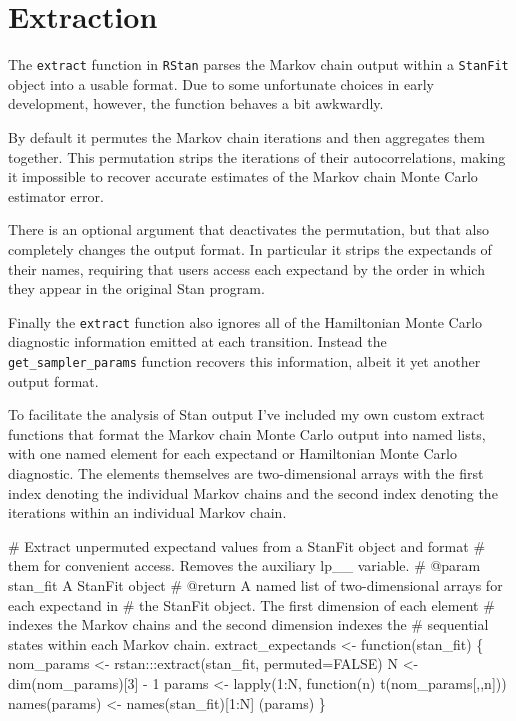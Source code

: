 \documentclass[
  letterpaper,
  DIV=11,
  numbers=noendperiod]{scrartcl}
\newenvironment{Shaded}{\begin{snugshade}}{\end{snugshade}}
\newcommand{\CommentTok}[1]{\textcolor[rgb]{0.37,0.37,0.37}{#1}}
\newcommand{\DecValTok}[1]{\textcolor[rgb]{0.68,0.00,0.00}{#1}}
\newcommand{\NormalTok}[1]{\textcolor[rgb]{0.00,0.23,0.31}{#1}}
\newcommand{\OperatorTok}[1]{\textcolor[rgb]{0.37,0.37,0.37}{#1}}
\begin{document}
\section{Extraction}\label{extraction}

The \texttt{extract} function in \texttt{RStan} parses the Markov chain
output within a \texttt{StanFit} object into a usable format. Due to
some unfortunate choices in early development, however, the function
behaves a bit awkwardly.

By default it permutes the Markov chain iterations and then aggregates
them together. This permutation strips the iterations of their
autocorrelations, making it impossible to recover accurate estimates of
the Markov chain Monte Carlo estimator error.

There is an optional argument that deactivates the permutation, but that
also completely changes the output format. In particular it strips the
expectands of their names, requiring that users access each expectand by
the order in which they appear in the original Stan program.

Finally the \texttt{extract} function also ignores all of the
Hamiltonian Monte Carlo diagnostic information emitted at each
transition. Instead the \texttt{get\_sampler\_params} function recovers
this information, albeit it yet another output format.

To facilitate the analysis of Stan output I've included my own custom
extract functions that format the Markov chain Monte Carlo output into
named lists, with one named element for each expectand or Hamiltonian
Monte Carlo diagnostic. The elements themselves are two-dimensional
arrays with the first index denoting the individual Markov chains and
the second index denoting the iterations within an individual Markov
chain.

\begin{Shaded}
\begin{Highlighting}[]
\CommentTok{\# Extract unpermuted expectand values from a StanFit object and format }
\CommentTok{\# them for convenient access.  Removes the auxiliary \textasciigrave{}lp\_\_\textasciigrave{} variable.}
\CommentTok{\# @param stan\_fit A StanFit object}
\CommentTok{\# @return A named list of two{-}dimensional arrays for each expectand in }
\CommentTok{\#         the StanFit object.  The first dimension of each element }
\CommentTok{\#         indexes the Markov chains and the second dimension indexes the }
\CommentTok{\#         sequential states within each Markov chain. }
\NormalTok{extract\_expectands }\OperatorTok{\textless{}{-}}\NormalTok{ function(stan\_fit) \{}
\NormalTok{  nom\_params }\OperatorTok{\textless{}{-}}\NormalTok{ rstan:::extract(stan\_fit, permuted}\OperatorTok{=}\NormalTok{FALSE)}
\NormalTok{  N }\OperatorTok{\textless{}{-}}\NormalTok{ dim(nom\_params)[}\DecValTok{3}\NormalTok{] }\OperatorTok{{-}} \DecValTok{1}
\NormalTok{  params }\OperatorTok{\textless{}{-}}\NormalTok{ lapply(}\DecValTok{1}\NormalTok{:N, function(n) t(nom\_params[,,n]))}
\NormalTok{  names(params) }\OperatorTok{\textless{}{-}}\NormalTok{ names(stan\_fit)[}\DecValTok{1}\NormalTok{:N]}
\NormalTok{  (params)}
\NormalTok{\}}
\end{Highlighting}
\end{Shaded}
\end{document}
